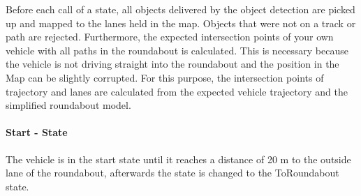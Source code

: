 \documentclass[11pt,oneside,openright]{mpreport}
\begin{document}


Before each call of a state, all objects delivered by the object detection are picked up and mapped to the lanes held in the map.
Objects that were not on a track or path are rejected.
Furthermore, the expected intersection points of your own vehicle with all paths in the roundabout is calculated. 
This is necessary because the vehicle is not driving straight into the roundabout and the position in the Map can be slightly corrupted. For this purpose,
the intersection points of trajectory and lanes are calculated from the expected vehicle trajectory and the simplified roundabout model.

\paragraph{Start - State}
The vehicle is in the start state until it reaches a distance of 20 m to the outside lane of the roundabout, afterwards the state is changed to the ToRoundabout state.
\end{document}
